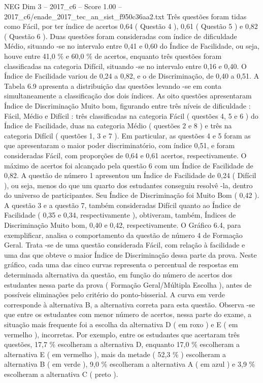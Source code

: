 \begin{textsample}{NEG Dim 3 – 2017\_c6 – Score 1.00 – 2017\_c6/enade\_2017\_tec\_an\_sist\_f950c36aa2.txt}
Três questões foram tidas como Fácil, por ter índice de acertos 0,64 ( Questão 4 ), 0,61 ( Questão 5 ) e 0,82 ( Questão 6 ).
Duas questões foram consideradas com índice de dificuldade Médio, situando -se no intervalo entre 0,41 e 0,60 do Índice de Facilidade, ou seja, houve entre 41,0 \% e 60,0 \% de acertos, enquanto três questões foram classificadas na categoria Difícil, situando -se no intervalo entre 0,16 e 0,40.
O Índice de Facilidade variou de 0,24 a 0,82, e o de Discriminação, de 0,40 a 0,51.
A Tabela 6.9 apresenta a distribuição das questões levando -se em conta simultaneamente a classificação dos dois índices.
As oito questões apresentaram Índice de Discriminação Muito bom, figurando entre três níveis de dificuldade : Fácil, Médio e Difícil : três classificadas na categoria Fácil ( questões 4, 5 e 6 ) do Índice de Facilidade, duas na categoria Médio ( questões 2 e 8 ) e três na categoria Difícil ( questões 1, 3 e 7 ).
Em particular, as questões 4 e 5 foram as que apresentaram o maior poder discriminatório, com índice 0,51, e foram consideradas Fácil, com proporções de 0,64 e 0,61 acertos, respectivamente.
O máximo de acertos foi alcançado pela questão 6 com um Índice de Facilidade de 0,82.
A questão de número 1 apresentou um Índice de Facilidade de 0,24 ( Difícil ), ou seja, menos do que um quarto dos estudantes conseguiu resolvê -la, dentro do universo de participantes.
Seu Índice de Discriminação foi Muito Bom ( 0,42 ).
A questão 3 e a questão 7, também consideradas Difícil quanto ao Índice de Facilidade ( 0,35 e 0,34, respectivamente ), obtiveram, também, Índices de Discriminação Muito bom, 0,40 e 0,42, respectivamente.
O Gráfico 6.4, para exemplificar, analisa o comportamento da questão de número 4 de Formação Geral.
Trata -se de uma questão considerada Fácil, com relação à facilidade e uma das que obteve o maior Índice de Discriminação dessa parte da prova.
Neste gráfico, cada uma das cinco curvas representa o percentual de respostas em determinada alternativa da questão, em função do número de acertos dos estudantes nessa parte da prova ( Formação Geral/Múltipla Escolha ), antes de possíveis eliminações pelo critério do ponto-bisserial.
A curva em verde corresponde à alternativa B, a alternativa correta para esta questão.
Observa -se que entre os estudantes com menor número de acertos, nessa parte do exame, a situação mais frequente foi a escolha da alternativa D ( em roxo ) e E ( em vermelho ), incorretas.
Por exemplo, entre os estudantes que acertaram três questões, 17,7 \% escolheram a alternativa D, enquanto 17,0 \% escolheram a alternativa E ( em vermelho ), mais da metade ( 52,3 \% ) escolheram a alternativa B ( em verde ), 9,0 \% escolheram a alternativa A ( em azul ) e 3,9 \% escolheram a alternativa C ( preto ).

\end{textsample}
